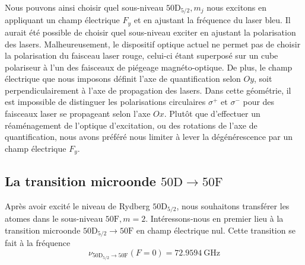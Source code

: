 Nous pouvons ainsi choisir quel sous-niveau $\mathrm{50D}_{5/2},m_j$ nous excitons en appliquant un champ électrique $F_y$ et en ajustant la fréquence du laser bleu.
Il aurait été possible de choisir quel sous-niveau exciter en ajustant la polarisation des lasers.
Malheureusement, le dispositif optique actuel ne permet pas de choisir la polarisation du faisceau laser rouge, celui-ci étant superposé sur un cube polariseur à l'un des faisceaux de piégeage magnéto-optique.
De plus, le champ électrique que nous imposons définit l'axe de quantification selon $Oy$, soit perpendiculairement à l'axe de propagation des lasers.
Dans cette géométrie, il est impossible de distinguer les polarisations circulaires $\sigma^+$ et $\sigma^-$ pour des faisceaux laser se propageant selon l'axe $Ox$.
Plutôt que d'effectuer un réaménagement de l'optique d'excitation, ou des rotations de l'axe de quantification, nous avons préféré nous limiter à lever la dégénérescence par un champ électrique $F_y$.
%
%



\clearpage
	\subsection{La transition microonde $\mathrm{50D \rightarrow 50F}$}
\noindent %
Après avoir excité le niveau de Rydberg $\mathrm{50D}_{5/2}$, nous souhaitons transférer les atomes dans le sous-niveau $\mathrm{50F},m=2$.
Intéressons-nous en premier lieu à la transition microonde $\mathrm{50D_{5/2} \rightarrow 50F}$ en champ électrique nul.
Cette transition se fait à la fréquence
\begin{equation}
\label{eq:freq_50D50F}
\nu_{\mathrm{50D_{5/2}\rightarrow50F}}(F=0)%
= \SI{72.9594}{\GHz}
\end{equation}

